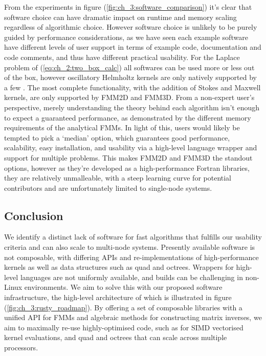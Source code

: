 From the experiments in figure (\ref{fig:ch_3:software_comparison}) it's clear that software choice can have dramatic impact on runtime and memory scaling regardless of algorithmic choice. However software choice is unlikely to be purely guided by performance considerations, as we have seen each example software have different levels of user support in terms of example code, documentation and code comments, and thus have different practical usability. For the Laplace problem of (\ref{eq:ch_2:two_box_calc}) all softwares can be used more or less out of the box, however oscillatory Helmholtz kernels are only natively supported by a few \cite{exafmm,wang2021exafmm,fmm2d, fmm3d}. The most complete functionality, with the addition of Stokes and Maxwell kernels, are only supported by FMM2D and FMM3D. From a non-expert user's perspective, merely understanding the theory behind each algorithm isn't enough to expect a guaranteed performance, as demonstrated by the different memory requirements of the analytical FMMs. In light of this, users would likely be tempted to pick a `median' option, which guarantees good performance, scalability, easy installation, and usability via a high-level language wrapper and support for multiple problems. This makes FMM2D and FMM3D the standout options, however as they're developed as a high-performance Fortran libraries, they are relatively unmalleable, with a steep learning curve for potential contributors and are unfortunately limited to single-node systems.

\subsection*{Conclusion}

We identify a distinct lack of software for fast algorithms that fulfills our usability criteria and can also scale to multi-node systems. Presently available software is not composable, with differing APIs and re-implementations of high-performance kernels as well as data structures such as quad and octrees. Wrappers for high-level languages are not uniformly available, and builds can be challenging in non-Linux environments. We aim to solve this with our proposed software infrastructure, the high-level architecture of which is illustrated in figure (\ref{fig:ch_3:rusty_roadmap}). By offering a set of composable libraries with a unified API for FMMs and algebraic methods for constructing matrix inverses, we aim to maximally re-use highly-optimised code, such as for SIMD vectorised kernel evaluations, and quad and octrees that can scale across multiple processors. 

